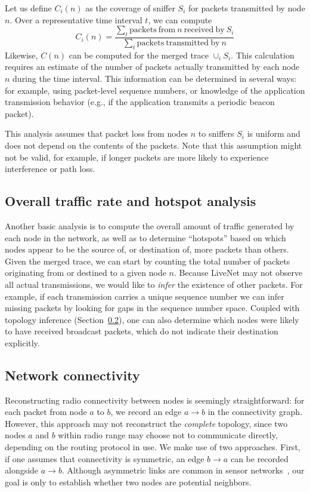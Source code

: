 Let us define $C_i(n)$ as the coverage of sniffer $S_i$ for packets
transmitted by node $n$. Over a representative time interval $t$, we can
compute 
\[ 
C_i(n) = \frac{\sum_t \mathrm{packets\ from\ } n \mathrm{\ received\ by\ } S_i}{\sum_t
\mathrm{packets\ transmitted\ by\ } n}
\]
Likewise, $C(n)$ can be computed for the merged trace $\cup_i S_i$.
This calculation requires an estimate of the number of packets
actually transmitted by each node $n$ during the time interval.
This information can be determined in several ways: for example,
using packet-level sequence numbers, or knowledge of the application
transmission behavior (e.g., if the application transmits a periodic
beacon packet). 

This analysis assumes that packet loss from nodes $n$ to sniffers
$S_i$ is uniform and does not depend on the contents of the packets.
Note that this assumption might not be valid, for example, if longer
packets are more likely to experience interference or path loss.

\subsection{Overall traffic rate and hotspot analysis}


Another basic analysis is to compute the overall amount of traffic
generated by each node in the network, as well as to determine
``hotspots'' based on which nodes appear to be the source of, or
destination of, more packets than others. Given the merged trace,
we can start by counting the total number of packets originating from
or destined to a given node $n$. Because LiveNet may not observe all 
actual transmissions, we would like to {\em infer} the existence of other
packets. For example, if each transmission carries a unique sequence
number we can infer missing packets by looking for gaps in the
sequence number space. Coupled with topology inference 
(Section~\ref{sec-livenet-topology}), one can also determine which nodes 
were likely to have received broadcast packets, which do not 
indicate their destination explicitly.

\subsection{Network connectivity}
\label{sec-livenet-topology}


Reconstructing radio connectivity between nodes is seemingly straightforward:
for each packet from node $a$ to $b$, we record an edge $a
\rightarrow b$ in the connectivity graph. However, this approach may
not reconstruct the {\em complete} topology, since two nodes $a$ and
$b$ within radio range may choose not to communicate directly, 
depending on the routing protocol in use. We make use of two
approaches. First, if one assumes that connectivity is symmetric, 
an edge $b \rightarrow a$ can be recorded alongside $a \rightarrow b$.
Although asymmetric links are common in sensor 
networks~\cite{scale}, our goal is only to establish
whether two nodes are potential neighbors.

